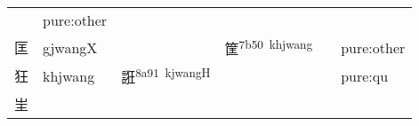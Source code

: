 \documentclass[14pt,a4paper]{scrartcl}
\begin{document}
\begin{longtable}[c]{@{}llllll@{}}
\begin{minipage}[t]{0.14\columnwidth}\raggedright\strut
\strut\end{minipage} &
\begin{minipage}[t]{0.14\columnwidth}\raggedright\strut
pure:other
\strut\end{minipage}\tabularnewline
\begin{minipage}[t]{0.14\columnwidth}\raggedright\strut
匡
\strut\end{minipage} &
\begin{minipage}[t]{0.14\columnwidth}\raggedright\strut
gjwangX
\strut\end{minipage} &
\begin{minipage}[t]{0.14\columnwidth}\raggedright\strut
\strut\end{minipage} &
\begin{minipage}[t]{0.14\columnwidth}\raggedright\strut
筐\textsuperscript{7b50~khjwang}
\strut\end{minipage} &
\begin{minipage}[t]{0.14\columnwidth}\raggedright\strut
\strut\end{minipage} &
\begin{minipage}[t]{0.14\columnwidth}\raggedright\strut
pure:other
\strut\end{minipage}\tabularnewline
\begin{minipage}[t]{0.14\columnwidth}\raggedright\strut
狂
\strut\end{minipage} &
\begin{minipage}[t]{0.14\columnwidth}\raggedright\strut
khjwang
\strut\end{minipage} &
\begin{minipage}[t]{0.14\columnwidth}\raggedright\strut
誑\textsuperscript{8a91~kjwangH}
\strut\end{minipage} &
\begin{minipage}[t]{0.14\columnwidth}\raggedright\strut
\strut\end{minipage} &
\begin{minipage}[t]{0.14\columnwidth}\raggedright\strut
\strut\end{minipage} &
\begin{minipage}[t]{0.14\columnwidth}\raggedright\strut
pure:qu
\strut\end{minipage}\tabularnewline
\begin{minipage}[t]{0.14\columnwidth}\raggedright\strut
㞷
\strut\end{minipage} &
\begin{minipage}[t]{0.14\columnwidth}\raggedright\strut

\end{minipage}
\end{longtable}
\end{document}
